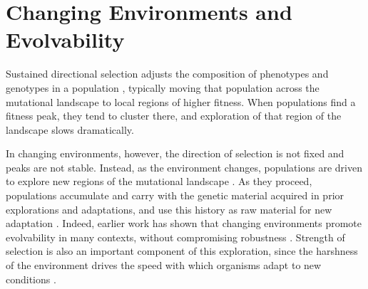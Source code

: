 \documentclass[PhD]{msu-thesis}
\begin{document}
\section{Changing Environments and Evolvability}
Sustained directional selection adjusts the composition of phenotypes and genotypes in a population \cite{wright_evolution_1931}, typically moving that population across the mutational landscape to local regions of higher fitness. When populations find a fitness peak, they tend to cluster there, and exploration of that region of the landscape slows dramatically.

In changing environments, however, the direction of selection is not fixed and peaks are not stable.  Instead, as the environment changes, populations are driven to explore new regions of the mutational landscape \cite{kashtan_varying_2007,connelly_negative_2015}. As they proceed, populations accumulate and carry with the genetic material acquired in prior explorations and adaptations, and use this history as raw material for new adaptation \cite{mcclintock_significance_1993}. Indeed, earlier work has shown that changing environments promote evolvability in many contexts, without compromising robustness \cite{crombach_evolution_2008,wilke_evolution_2001}. Strength of selection is also an important component of this exploration, since the harshness of the environment drives the speed with which organisms adapt to new conditions \cite{goddard_sex_2005}.

\end{document}
